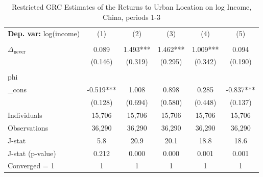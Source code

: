 \begin{table}[htbp] \centering \begin{threeparttable}
 \caption{Restricted GRC Estimates of the Returns to Urban Location on log Income, China, periods 1-3} 
 \label{tab:GRC_CHN123_income_urban_unb} 
\begin{tabular}{l ccccc} \toprule  \textbf{Dep. var:}  log(income) 
                    &\multicolumn{1}{c}{(1)}   &\multicolumn{1}{c}{(2)}   &\multicolumn{1}{c}{(3)}   &\multicolumn{1}{c}{(4)}   &\multicolumn{1}{c}{(5)}   \\
                    &               &               &               &               &               \\
\addlinespace
$\Delta_{\text{never}}$&       0.089   &       1.493***&       1.462***&       1.009***&       0.094   \\
                    &     (0.146)   &     (0.319)   &     (0.295)   &     (0.342)   &     (0.190)   \\
                    &               &               &               &               &               \\
\addlinespace
phi                 &               &               &               &               &               \\
_cons               &      -0.519***&       1.008   &       0.898   &       0.285   &      -0.837***\\
                    &     (0.128)   &     (0.694)   &     (0.580)   &     (0.448)   &     (0.137)   \\
\addlinespace
Individuals         &      15,706   &      15,706   &      15,706   &      15,706   &      15,706   \\
Observations        &      36,290   &      36,290   &      36,290   &      36,290   &      36,290   \\
J-stat              &         5.8   &        20.9   &        20.1   &        18.8   &        18.6   \\
J-stat (p-value)    &       0.212   &       0.000   &       0.000   &       0.001   &       0.001   \\
Converged = 1       &           1   &           1   &           1   &           1   &           1   \\

\end{tabular}
\end{threeparttable}
\end{table}
